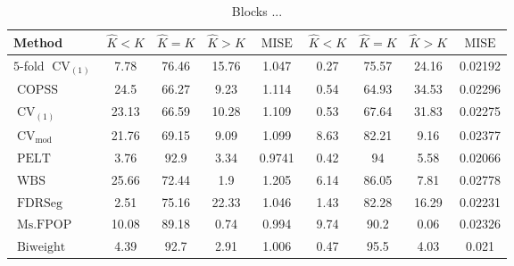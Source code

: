 \begin{table}[ht]
\centering
\begin{tabular}{|l|cccc|cccc|}
  \hline
Method & $\hat{K} < K$ & $\hat{K} = K$ & $\hat{K} > K$ & $\operatorname{MISE}$ & $\hat{K} < K$ & $\hat{K} = K$ & $\hat{K} > K$ & $\operatorname{MISE}$ \\ 
  \hline
$5$-fold $\operatorname{CV}_{(1)}$ &  7.78 & 76.46 & 15.76 & 1.047 &  0.27 & 75.57 & 24.16 & 0.02192 \\ 
  $\operatorname{COPSS}$ &  24.5 & 66.27 &  9.23 & 1.114 &  0.54 & 64.93 & 34.53 & 0.02296 \\ 
  $\operatorname{CV}_{(1)}$ & 23.13 & 66.59 & 10.28 & 1.109 &  0.53 & 67.64 & 31.83 & 0.02275 \\ 
  $\operatorname{CV}_{\operatorname{mod}}$ & 21.76 & 69.15 &  9.09 & 1.099 &  8.63 & 82.21 &  9.16 & 0.02377 \\ 
  $\operatorname{PELT}$ &  3.76 &  92.9 &  3.34 & 0.9741 &  0.42 &    94 &  5.58 & 0.02066 \\ 
  $\operatorname{WBS}$ & 25.66 & 72.44 &   1.9 & 1.205 &  6.14 & 86.05 &  7.81 & 0.02778 \\ 
  $\operatorname{FDRSeg}$ &  2.51 & 75.16 & 22.33 & 1.046 &  1.43 & 82.28 & 16.29 & 0.02231 \\ 
  $\operatorname{Ms.FPOP}$ & 10.08 & 89.18 &  0.74 & 0.994 &  9.74 &  90.2 &  0.06 & 0.02326 \\ 
  $\operatorname{Biweight}$ &  4.39 &  92.7 &  2.91 & 1.006 &  0.47 &  95.5 &  4.03 & 0.021 \\ 
   \hline
\end{tabular}
\caption{Blocks ...} 
\end{table}
